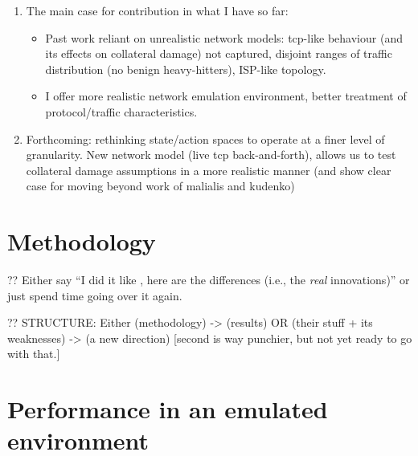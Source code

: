 \documentclass[conference, letterpaper, 10pt, times]{IEEEtran}
\begin{document}
\begin{enumerate}
	\item The main case for contribution in what I have so far:
	\begin{itemize}
		\item Past work reliant on unrealistic network models: tcp-like behaviour (and its effects on collateral damage) not captured, disjoint ranges of traffic distribution (no benign heavy-hitters), ISP-like topology.
		\item I offer more realistic network emulation environment, better treatment of protocol/traffic characteristics.
	\end{itemize}
	\item Forthcoming: rethinking state/action spaces to operate at a finer level of granularity. New network model (live tcp back-and-forth), allows us to test collateral damage assumptions in a more realistic manner (and show clear case for moving beyond work of malialis and kudenko)
\end{enumerate}

\section{Methodology}

?? Either say ``I did it like \textcite{DBLP:journals/eaai/MalialisK15}, here are the differences (i.e., the \emph{real} innovations)'' or just spend time going over it again.

?? STRUCTURE: Either (methodology) -> (results) OR (their stuff + its weaknesses) -> (a new direction) [second is way punchier, but not yet ready to go with that.]

\section{Performance in an emulated environment}
\end{document}

